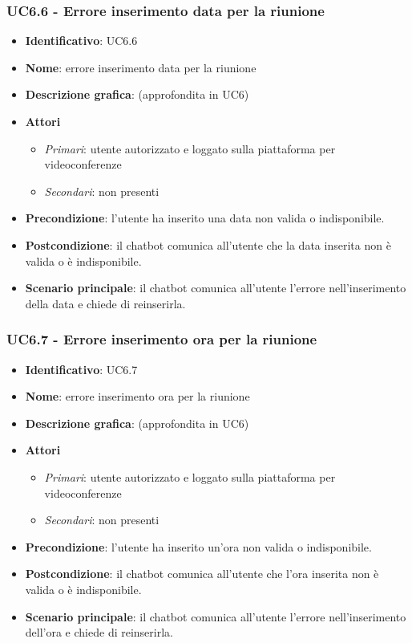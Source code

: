 \subsubsection{UC6.6 - Errore inserimento data per la riunione}
\begin{itemize}
    \item \textbf{Identificativo}: UC6.6
    \item \textbf{Nome}: errore inserimento data per la riunione
    \item \textbf{Descrizione grafica}: (approfondita in UC6)
    \item \textbf{Attori}
 \begin{itemize} 
    \item \textit{Primari}: utente autorizzato e loggato sulla piattaforma per videoconferenze
    \item \textit{Secondari}: non presenti
 \end{itemize}
 \item \textbf{Precondizione}: l'utente ha inserito una data non valida o indisponibile.
 \item \textbf{Postcondizione}: il chatbot comunica all'utente che la data inserita non è valida o è indisponibile.
 \item \textbf{Scenario principale}: il chatbot comunica all'utente l'errore nell'inserimento della data e chiede di reinserirla.
\end{itemize}
\subsubsection{UC6.7 - Errore inserimento ora per la riunione}
\begin{itemize}
    \item \textbf{Identificativo}: UC6.7
    \item \textbf{Nome}: errore inserimento ora per la riunione
    \item \textbf{Descrizione grafica}: (approfondita in UC6)
    \item \textbf{Attori}
 \begin{itemize} 
    \item \textit{Primari}: utente autorizzato e loggato sulla piattaforma per videoconferenze
    \item \textit{Secondari}: non presenti
 \end{itemize}
 \item \textbf{Precondizione}: l'utente ha inserito un'ora non valida o indisponibile.
 \item \textbf{Postcondizione}: il chatbot comunica all'utente che l'ora inserita non è valida o è indisponibile.
 \item \textbf{Scenario principale}: il chatbot comunica all'utente l'errore nell'inserimento dell'ora e chiede di reinserirla.
\end{itemize}
